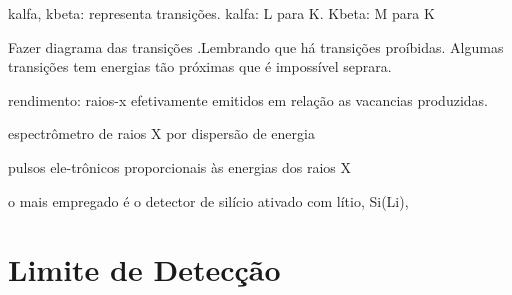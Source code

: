 kalfa, kbeta: representa transições. kalfa: L para K. Kbeta: M para K

Fazer diagrama das transições .Lembrando que há transições proíbidas. 
Algumas transições tem energias tão próximas que é impossível seprara.


rendimento: raios-x efetivamente emitidos em relação as vacancias produzidas. 

espectrômetro de raios X por dispersão de energia

pulsos ele-trônicos proporcionais às energias dos raios X

o mais empregado é o detector de silício ativado com lítio, Si(Li),
 


\section{Limite de Detecção}



